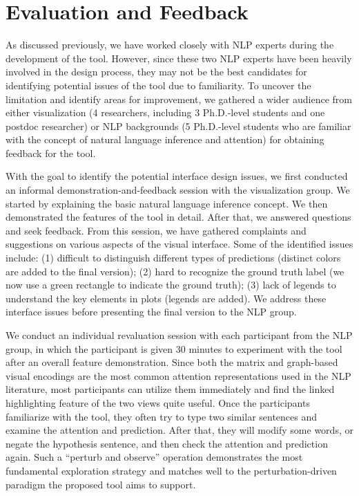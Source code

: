\section{Evaluation and Feedback}
%
As discussed previously, we have worked closely with NLP experts during the development of the tool. However, since these two NLP experts have been heavily involved in the design process, they may not be the best candidates for identifying potential issues of the tool due to familiarity.  To uncover the limitation and identify areas for improvement, we gathered a wider audience from either visualization (4 researchers, including 3 Ph.D.-level students and one postdoc researcher) or NLP backgrounds (5 Ph.D.-level students who are familiar with the concept of natural language inference and attention) for obtaining feedback for the tool.  

With the goal to identify the potential interface design issues, we first conducted an informal demonstration-and-feedback session with the visualization group. We started by explaining the basic natural language inference concept. We then demonstrated the features of the tool in detail. After that, we answered questions and seek feedback.
%
From this session, we have gathered complaints and suggestions on various aspects of the visual interface. Some of the identified issues include: (1) difficult to distinguish different types of predictions (distinct colors are added to the final version); (2) hard to recognize the ground truth label (we now use a green rectangle to indicate the ground truth); (3) lack of legends to understand the key elements in plots (legends are added). We address these interface issues before presenting the final version to the NLP group.

We conduct an individual revaluation session with each participant from the NLP group, in which the participant is given 30 minutes to experiment with the tool after an overall feature demonstration. 
%
Since both the matrix and graph-based visual encodings are the most common attention representations used in the NLP literature, most participants can utilize them immediately and find the linked highlighting feature of the two views quite useful.
% 
Once the participants familiarize with the tool, they often try to type two similar sentences and examine the attention and prediction. After that, they will modify some words, or negate the hypothesis sentence, and then check the attention and prediction again.
%
Such a ``perturb and observe'' operation demonstrates the most fundamental exploration strategy and matches well to the perturbation-driven paradigm the proposed tool aims to support.

